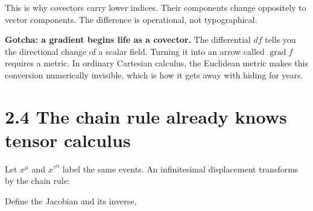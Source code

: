 \documentclass[
  11pt,
  letterpaper,
  oneside,
  openany]{scrbook}
\renewenvironment{quote}{\begin{tcolorbox}[enhanced,breakable,sharp corners,colback=pale,colframe=accent,boxrule=0pt,borderline west={2pt}{0pt}{accent},left=10pt,right=10pt,top=7pt,bottom=7pt]}{\end{tcolorbox}}
\begin{document}
\begin{center}
\begingroup
{}
\ifdim\wd\grmathbox>\linewidth
\resizebox{\linewidth}{!}{\usebox{\grmathbox}}
\else\usebox{\grmathbox}\fi
\endgroup
\end{center}

This is why covectors carry lower indices. Their components change
oppositely to vector components. The difference is operational, not
typographical.

\begin{quote}
\textbf{Gotcha: a gradient begins life as a covector.} The differential
\(df\) tells you the directional change of a scalar field. Turning it
into an arrow called \(\operatorname{grad}f\) requires a metric. In
ordinary Cartesian calculus, the Euclidean metric makes this conversion
numerically invisible, which is how it gets away with hiding for years.
\end{quote}

\hypertarget{the-chain-rule-already-knows-tensor-calculus}{%
\section{2.4 The chain rule already knows tensor
calculus}\label{the-chain-rule-already-knows-tensor-calculus}}

Let \(x^\mu\) and \(x'^\alpha\) label the same events. An infinitesimal
displacement transforms by the chain rule:

\begin{center}
\begingroup
{}
\ifdim\wd\grmathbox>\linewidth
\resizebox{\linewidth}{!}{\usebox{\grmathbox}}
\else\usebox{\grmathbox}\fi
\endgroup
\end{center}

Define the Jacobian and its inverse,

\begin{center}
\begingroup
{}
\ifdim\wd\grmathbox>\linewidth
\resizebox{\linewidth}{!}{\usebox{\grmathbox}}
\else\usebox{\grmathbox}\fi
\endgroup
\end{center}
\end{document}
